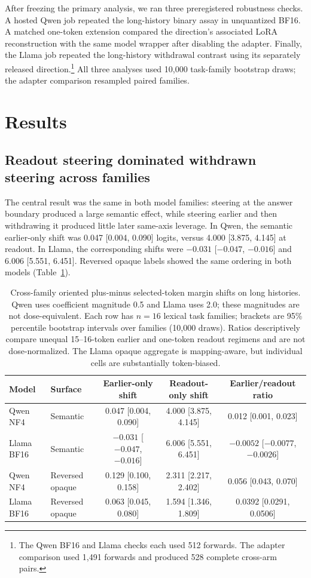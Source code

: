 \documentclass[10pt,twocolumn]{article}
\begin{document}
After freezing the primary analysis, we ran three preregistered robustness checks. A hosted Qwen job repeated the long-history binary assay in unquantized BF16. A matched one-token extension compared the direction's associated LoRA reconstruction with the same model wrapper after disabling the adapter. Finally, the Llama job repeated the long-history withdrawal contrast using its separately released direction.\footnote{The Qwen BF16 and Llama checks each used 512 forwards. The adapter comparison used 1,491 forwards and produced 528 complete cross-arm pairs.} All three analyses used 10,000 task-family bootstrap draws; the adapter comparison resampled paired families.

\section{Results}

\subsection{Readout steering dominated withdrawn steering across families}

The central result was the same in both model families: steering at the answer boundary produced a large semantic effect, while steering earlier and then withdrawing it produced little later same-axis leverage. In Qwen, the semantic earlier-only shift was 0.047 [0.004, 0.090] logits, versus 4.000 [3.875, 4.145] at readout. In Llama, the corresponding shifts were $-0.031$ [$-0.047$, $-0.016$] and 6.006 [5.551, 6.451]. Reversed opaque labels showed the same ordering in both models (Table~\ref{tab:primary}).

\begin{table}[t]
  \centering
  \caption{Cross-family oriented plus-minus selected-token margin shifts on long histories. Qwen uses coefficient magnitude 0.5 and Llama uses 2.0; these magnitudes are not dose-equivalent. Each row has $n=16$ lexical task families; brackets are 95\% percentile bootstrap intervals over families (10,000 draws). Ratios descriptively compare unequal 15--16-token earlier and one-token readout regimens and are not dose-normalized. The Llama opaque aggregate is mapping-aware, but individual cells are substantially token-biased.}
  \label{tab:primary}
  \small
  \begin{tabular}{@{}llccc@{}}
    \toprule
    Model & Surface & Earlier-only shift & Readout-only shift & Earlier/readout ratio \\
    \midrule
    Qwen NF4 & Semantic & 0.047 [0.004, 0.090] & 4.000 [3.875, 4.145] & 0.012 [0.001, 0.023] \\
    Llama BF16 & Semantic & $-0.031$ [$-0.047$, $-0.016$] & 6.006 [5.551, 6.451] & $-0.0052$ [$-0.0077$, $-0.0026$] \\
    Qwen NF4 & Reversed opaque & 0.129 [0.100, 0.158] & 2.311 [2.217, 2.402] & 0.056 [0.043, 0.070] \\
    Llama BF16 & Reversed opaque & 0.063 [0.045, 0.080] & 1.594 [1.346, 1.809] & 0.0392 [0.0291, 0.0506] \\
    \bottomrule
  \end{tabular}
\end{table}
\end{document}
